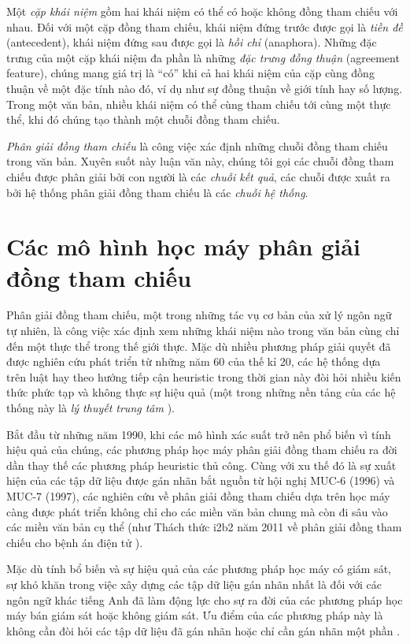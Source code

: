 Một \emph{cặp khái niệm} gồm hai khái niệm có thể có hoặc không đồng tham chiếu với nhau. Đối với một cặp đồng tham chiếu, khái niệm đứng trước được gọi là \emph{tiền đề} (antecedent), khái niệm đứng sau được gọi là \emph{hồi chỉ} (anaphora). Những đặc trưng của một cặp khái niệm đa phần là những \emph{đặc trưng đồng thuận} (agreement feature), chúng mang giá trị là ``có'' khi cả hai khái niệm của cặp cùng đồng thuận về một đặc tính nào đó, ví dụ như sự đồng thuận về giới tính hay số lượng. Trong một văn bản, nhiều khái niệm có thể cùng tham chiếu tới cùng một thực thể, khi đó chúng tạo thành một chuỗi đồng tham chiếu.

\emph{Phân giải đồng tham chiếu} là công việc xác định những chuỗi đồng tham chiếu trong văn bản. Xuyên suốt này luận văn này, chúng tôi gọi các chuỗi đồng tham chiếu được phân giải bởi con người là các \emph{chuỗi kết quả}, các chuỗi được xuất ra bởi hệ thống phân giải đồng tham chiếu là các \emph{chuỗi hệ thống}.

\section{Các mô hình học máy phân giải đồng tham chiếu}
Phân giải đồng tham chiếu, một trong những tác vụ cơ bản của xử lý ngôn ngữ tự nhiên, là công việc xác định xem những khái niệm nào trong văn bản cùng chỉ đến một thực thể trong thế giới thực. Mặc dù nhiều phương pháp giải quyết đã được nghiên cứu phát triển từ những năm 60 của thế kỉ 20, các hệ thống dựa trên luật hay theo hướng tiếp cận heuristic trong thời gian này đòi hỏi nhiều kiến thức phức tạp và không thực sự hiệu quả (một trong những nền tảng của các hệ thống này là \emph{lý thuyết trung tâm} \cite{Grosz1983}).

Bắt đầu từ những năm 1990, khi các mô hình xác suất trở nên phổ biến vì tính hiệu quả của chúng, các phương pháp học máy phân giải đồng tham chiếu ra đời dần thay thế các phương pháp heuristic thủ công. Cùng với xu thế đó là sự xuất hiện của các tập dữ liệu được gán nhãn bắt nguồn từ hội nghị MUC-6 (1996) và MUC-7 (1997), các nghiên cứu về phân giải đồng tham chiếu dựa trên học máy càng được phát triển không chỉ cho các miền văn bản chung mà còn đi sâu vào các miền văn bản cụ thể (như Thách thức i2b2 năm 2011 về phân giải đồng tham chiếu cho bệnh án điện tử \cite{OzlemUzuner2012}).

Mặc dù tính bổ biến và sự hiệu quả của các phương pháp học máy có giám sát, sự khó khăn trong việc xây dựng các tập dữ liệu gán nhãn nhất là đối với các ngôn ngữ khác tiếng Anh đã làm động lực cho sự ra đời của các phương pháp học máy bán giám sát hoặc không giám sát. Ưu điểm của các phương pháp này là không cần đòi hỏi các tập dữ liệu đã gán nhãn hoặc chỉ cần gán nhãn một phần \cite{CardieWagstaff1999}.

